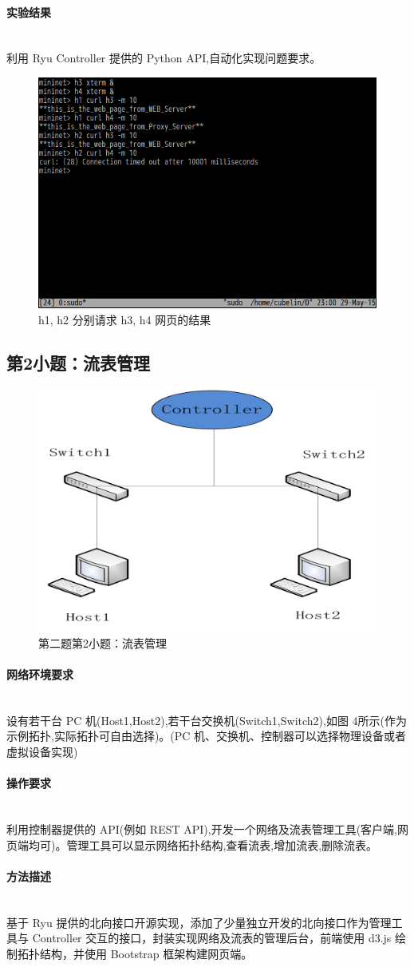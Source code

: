\documentclass[format=draft,language=chinese,category=SDN]{hustreport}
\newcommand{\myparagraph}[1]{\paragraph{#1}\mbox{}\\}
\begin{document}
\myparagraph{实验结果}
利用 Ryu Controller 提供的 Python API,自动化实现问题要求。

\begin{figure}[!h]
\centering
\includegraphics[width=.618\textwidth]{fig/2_1-3.png}
\caption{h1, h2 分别请求 h3, h4 网页的结果}\label{fig:Q2_1-3}
\end{figure}

\clearpage

\subsection{第2小题：流表管理}\label{sec:Q2_2}

\begin{figure}[!h]
\centering
\includegraphics[width=.618\textwidth]{fig/2_2-0.png}
\caption{第二题第2小题：流表管理}\label{fig:Q2_2-0}
\end{figure}

\myparagraph{网络环境要求}
设有若干台 PC 机(Host1,Host2),若干台交换机(Switch1,Switch2),如图 4所示(作为示例拓扑,实际拓扑可自由选择)。(PC 机、交换机、控制器可以选择物理设备或者虚拟设备实现)

\myparagraph{操作要求}
利用控制器提供的 API(例如 REST API),开发一个网络及流表管理工具(客户端,网页端均可)。管理工具可以显示网络拓扑结构,查看流表,增加流表,删除流表。

\myparagraph{方法描述}
基于 Ryu 提供的北向接口开源实现，添加了少量独立开发的北向接口作为管理工具与 Controller 交互的接口，封装实现网络及流表的管理后台，前端使用 d3.js 绘制拓扑结构，并使用 Bootstrap 框架构建网页端。
\end{document}
